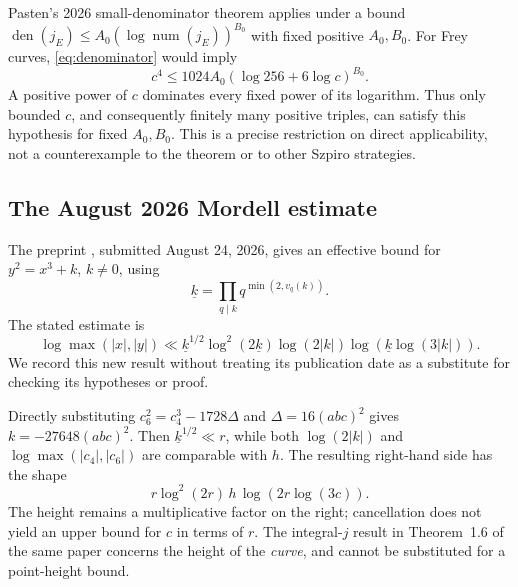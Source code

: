\documentclass[11pt]{amsart}
\theoremstyle{definition}
\theoremstyle{remark}
\newcommand{\den}{\operatorname{den}}
\newcommand{\num}{\operatorname{num}}
\begin{document}
Pasten's 2026 small-denominator theorem
\cite[Theorem~1.2]{PastenSmall} applies under a bound
$\den(j_E)\le A_0(\log\num(j_E))^{B_0}$ with fixed positive
$A_0,B_0$. For Frey curves, \eqref{eq:denominator} would imply
\[
 c^4\le1024A_0(\log256+6\log c)^{B_0}.
\]
A positive power of $c$ dominates every fixed power of its logarithm.
Thus only bounded $c$, and consequently finitely many positive triples,
can satisfy this hypothesis for fixed $A_0,B_0$.
This is a precise restriction on direct applicability, not a
counterexample to the theorem or to other Szpiro strategies.

\subsection{The August 2026 Mordell estimate}
The preprint \cite[Theorem~1.3]{PastenNew}, submitted August 24, 2026,
gives an effective bound for $y^2=x^3+k$, $k\ne0$, using
\[
 \underline{k}=\prod_{q\mid k}q^{\min(2,v_q(k))}.
\]
The stated estimate is
\begin{equation}\label{eq:pasten}
 \log\max(|x|,|y|)\ll
 \underline{k}^{1/2}\log^2(2\underline{k})\log(2|k|)
 \log\!\left(\underline{k}\log(3|k|)\right).
\end{equation}
We record this new result without treating its publication date as a
substitute for checking its hypotheses or proof.

Directly substituting $c_6^2=c_4^3-1728\Delta$ and
$\Delta=16(abc)^2$ gives $k=-27648(abc)^2$.
Then $\underline{k}^{1/2}\ll r$, while both
$\log(2|k|)$ and $\log\max(|c_4|,|c_6|)$ are comparable with $h$.
The resulting right-hand side has the shape
\[
 r\log^2(2r)\,h\,\log(2r\log(3c)).
\]
The height remains a multiplicative factor on the right; cancellation
does not yield an upper bound for $c$ in terms of $r$.
The integral-$j$ result in Theorem~1.6 of the same paper concerns the
height of the \emph{curve}, and cannot be substituted for a point-height bound.
\end{document}
